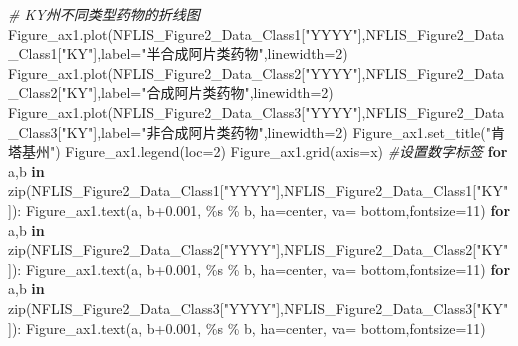 \documentclass[
]{article}
\newenvironment{Shaded}{}{}
\newcommand{\BuiltInTok}[1]{#1}
\newcommand{\CommentTok}[1]{\textcolor[rgb]{0.38,0.63,0.69}{\textit{#1}}}
\newcommand{\ControlFlowTok}[1]{\textcolor[rgb]{0.00,0.44,0.13}{\textbf{#1}}}
\newcommand{\DecValTok}[1]{\textcolor[rgb]{0.25,0.63,0.44}{#1}}
\newcommand{\FloatTok}[1]{\textcolor[rgb]{0.25,0.63,0.44}{#1}}
\newcommand{\KeywordTok}[1]{\textcolor[rgb]{0.00,0.44,0.13}{\textbf{#1}}}
\newcommand{\NormalTok}[1]{#1}
\newcommand{\OperatorTok}[1]{\textcolor[rgb]{0.40,0.40,0.40}{#1}}
\newcommand{\SpecialCharTok}[1]{\textcolor[rgb]{0.25,0.44,0.63}{#1}}
\newcommand{\StringTok}[1]{\textcolor[rgb]{0.25,0.44,0.63}{#1}}
\begin{document}
\begin{Shaded}
\begin{Highlighting}[]
\CommentTok{\# KY州不同类型药物的折线图}
\NormalTok{Figure\_ax1.plot(NFLIS\_Figure2\_Data\_Class1[}\StringTok{"YYYY"}\NormalTok{],NFLIS\_Figure2\_Data\_Class1[}\StringTok{"KY"}\NormalTok{],label}\OperatorTok{=}\StringTok{"半合成阿片类药物"}\NormalTok{,linewidth}\OperatorTok{=}\DecValTok{2}\NormalTok{)}
\NormalTok{Figure\_ax1.plot(NFLIS\_Figure2\_Data\_Class2[}\StringTok{"YYYY"}\NormalTok{],NFLIS\_Figure2\_Data\_Class2[}\StringTok{"KY"}\NormalTok{],label}\OperatorTok{=}\StringTok{"合成阿片类药物"}\NormalTok{,linewidth}\OperatorTok{=}\DecValTok{2}\NormalTok{)}
\NormalTok{Figure\_ax1.plot(NFLIS\_Figure2\_Data\_Class3[}\StringTok{"YYYY"}\NormalTok{],NFLIS\_Figure2\_Data\_Class3[}\StringTok{"KY"}\NormalTok{],label}\OperatorTok{=}\StringTok{"非合成阿片类药物"}\NormalTok{,linewidth}\OperatorTok{=}\DecValTok{2}\NormalTok{)}
\NormalTok{Figure\_ax1.set\_title(}\StringTok{"肯塔基州"}\NormalTok{)}
\NormalTok{Figure\_ax1.legend(loc}\OperatorTok{=}\DecValTok{2}\NormalTok{)}
\NormalTok{Figure\_ax1.grid(axis}\OperatorTok{=}\StringTok{\textquotesingle{}x\textquotesingle{}}\NormalTok{)}
 \CommentTok{\#设置数字标签}
\ControlFlowTok{for}\NormalTok{ a,b }\KeywordTok{in} \BuiltInTok{zip}\NormalTok{(NFLIS\_Figure2\_Data\_Class1[}\StringTok{"YYYY"}\NormalTok{],NFLIS\_Figure2\_Data\_Class1[}\StringTok{"KY"}\NormalTok{]):}
\NormalTok{    Figure\_ax1.text(a, b}\OperatorTok{+}\FloatTok{0.001}\NormalTok{, }\StringTok{\textquotesingle{}}\SpecialCharTok{\%s}\StringTok{\textquotesingle{}} \OperatorTok{\%}\NormalTok{ b, ha}\OperatorTok{=}\StringTok{\textquotesingle{}center\textquotesingle{}}\NormalTok{, va}\OperatorTok{=} \StringTok{\textquotesingle{}bottom\textquotesingle{}}\NormalTok{,fontsize}\OperatorTok{=}\DecValTok{11}\NormalTok{)}
\ControlFlowTok{for}\NormalTok{ a,b }\KeywordTok{in} \BuiltInTok{zip}\NormalTok{(NFLIS\_Figure2\_Data\_Class2[}\StringTok{"YYYY"}\NormalTok{],NFLIS\_Figure2\_Data\_Class2[}\StringTok{"KY"}\NormalTok{]):}
\NormalTok{    Figure\_ax1.text(a, b}\OperatorTok{+}\FloatTok{0.001}\NormalTok{, }\StringTok{\textquotesingle{}}\SpecialCharTok{\%s}\StringTok{\textquotesingle{}} \OperatorTok{\%}\NormalTok{ b, ha}\OperatorTok{=}\StringTok{\textquotesingle{}center\textquotesingle{}}\NormalTok{, va}\OperatorTok{=} \StringTok{\textquotesingle{}bottom\textquotesingle{}}\NormalTok{,fontsize}\OperatorTok{=}\DecValTok{11}\NormalTok{)}
\ControlFlowTok{for}\NormalTok{ a,b }\KeywordTok{in} \BuiltInTok{zip}\NormalTok{(NFLIS\_Figure2\_Data\_Class3[}\StringTok{"YYYY"}\NormalTok{],NFLIS\_Figure2\_Data\_Class3[}\StringTok{"KY"}\NormalTok{]):}
\NormalTok{    Figure\_ax1.text(a, b}\OperatorTok{+}\FloatTok{0.001}\NormalTok{, }\StringTok{\textquotesingle{}}\SpecialCharTok{\%s}\StringTok{\textquotesingle{}} \OperatorTok{\%}\NormalTok{ b, ha}\OperatorTok{=}\StringTok{\textquotesingle{}center\textquotesingle{}}\NormalTok{, va}\OperatorTok{=} \StringTok{\textquotesingle{}bottom\textquotesingle{}}\NormalTok{,fontsize}\OperatorTok{=}\DecValTok{11}\NormalTok{)}


\end{Highlighting}
\end{Shaded}
\end{document}
